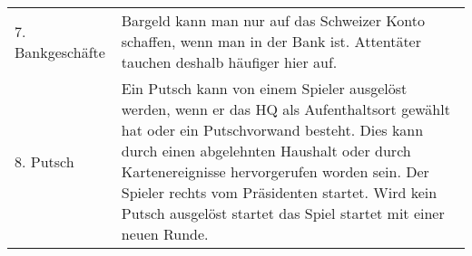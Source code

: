 \documentclass[5pt]{article}
\begin{document}
\begin{tabular}{p{4cm}p{14.5cm}}
		7. Bankgeschäfte 		& 	 Bargeld kann man nur auf das Schweizer Konto schaffen, wenn man in der Bank ist. Attentäter tauchen deshalb häufiger hier auf.\\

		8. Putsch 				& 	 Ein Putsch kann von einem Spieler ausgelöst werden, wenn er  das HQ als Aufenthaltsort gewählt hat oder ein Putschvorwand besteht. Dies kann durch einen abgelehnten Haushalt oder durch Kartenereignisse hervorgerufen worden sein.
								Der Spieler rechts vom Präsidenten startet. Wird kein Putsch ausgelöst startet das Spiel startet mit einer neuen Runde.\\    
    
    
    \bottomrule
    \end{tabular}
\end{document}
